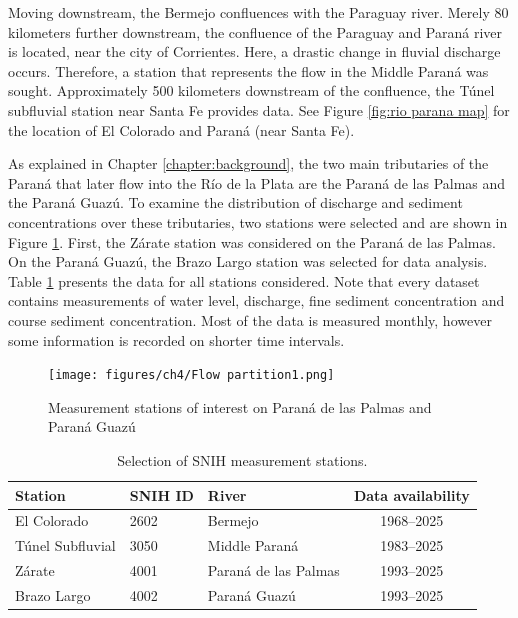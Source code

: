 Moving downstream, the Bermejo confluences with the Paraguay river. Merely 80 kilometers further downstream, the confluence of the Paraguay and Paraná river is located, near the city of Corrientes. Here, a drastic change in fluvial discharge occurs. Therefore, a station that represents the flow in the Middle Paraná was sought. Approximately 500 kilometers downstream of the confluence, the Túnel subfluvial station near Santa Fe provides data. See Figure \ref{fig:rio parana map} for the location of El Colorado and Paraná (near Santa Fe). 

As explained in Chapter \ref{chapter:background}, the two main tributaries of the Paraná that later flow into the Río de la Plata are the Paraná de las Palmas and the Paraná Guazú. To examine the distribution of discharge and sediment concentrations over these tributaries, two stations were selected and are shown in Figure \ref{fig:flow partition}. First, the Zárate station was considered on the Paraná de las Palmas. On the Paraná Guazú, the Brazo Largo station was selected for data analysis. Table \ref{tab:stations data collection} presents the data for all stations considered. Note that every dataset contains measurements of water level, discharge, fine sediment concentration and course sediment concentration. Most of the data is measured monthly, however some information is recorded on shorter time intervals. 

\begin{figure}[H]
    \centering
    \texttt{[image: figures/ch4/Flow partition1.png]}
    \caption{Measurement stations of interest on Paraná de las Palmas and Paraná Guazú}
    \label{fig:flow partition}
\end{figure}

\begin{table}[H]
    \centering
    \renewcommand{\arraystretch}{1.2} %
    \setlength{\tabcolsep}{8pt}       %
    \begin{tabular}{lllc}
        \toprule
        Station & SNIH ID & River & Data availability \\
        \midrule
        El Colorado         & 2602 & Bermejo               & 1968--2025 \\
        Túnel Subfluvial    & 3050 & Middle Paraná         & 1983--2025 \\
        Zárate              & 4001 & Paraná de las Palmas  & 1993--2025 \\
        Brazo Largo         & 4002 & Paraná Guazú          & 1993--2025 \\
        \bottomrule
    \end{tabular}
    \caption{Selection of SNIH measurement stations.}
    \label{tab:stations data collection}
\end{table}

